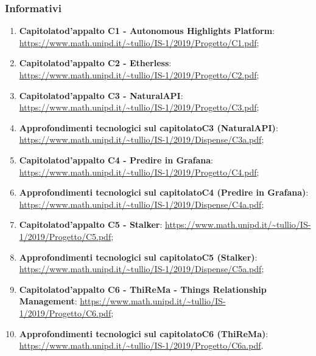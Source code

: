 \subsubsection{Informativi}
\begin{enumerate}
    \item \textbf{Capitolato}\glosp \textbf{d'appalto C1 - Autonomous Highlights Platform}: \url{https://www.math.unipd.it/~tullio/IS-1/2019/Progetto/C1.pdf};
    \item \textbf{Capitolato}\glosp \textbf{d'appalto C2 - Etherless}: \url{https://www.math.unipd.it/~tullio/IS-1/2019/Progetto/C2.pdf};
    \item \textbf{Capitolato}\glosp \textbf{d'appalto C3 - NaturalAPI}: \url{https://www.math.unipd.it/~tullio/IS-1/2019/Progetto/C3.pdf};
    \item \textbf{Approfondimenti tecnologici sul capitolato}\glosp \textbf{C3 (NaturalAPI)}: \url{https://www.math.unipd.it/~tullio/IS-1/2019/Dispense/C3a.pdf};
    \item \textbf{Capitolato}\glosp \textbf{d'appalto C4 - Predire in Grafana}\glo: \url{https://www.math.unipd.it/~tullio/IS-1/2019/Progetto/C4.pdf};
    \item \textbf{Approfondimenti tecnologici sul capitolato}\glosp \textbf{C4 (Predire in Grafana}\glo \textbf{)}: \url{https://www.math.unipd.it/~tullio/IS-1/2019/Dispense/C4a.pdf};
    \item \textbf{Capitolato}\glosp \textbf{d'appalto C5 - Stalker}: \url{https://www.math.unipd.it/~tullio/IS-1/2019/Progetto/C5.pdf};
    \item \textbf{Approfondimenti tecnologici sul capitolato}\glosp \textbf{C5 (Stalker)}: \url{https://www.math.unipd.it/~tullio/IS-1/2019/Dispense/C5a.pdf};
    \item \textbf{Capitolato}\glosp \textbf{d'appalto C6 - ThiReMa - Things Relationship Management}: \url{https://www.math.unipd.it/~tullio/IS-1/2019/Progetto/C6.pdf};
    \item \textbf{Approfondimenti tecnologici sul capitolato}\glosp \textbf{C6 (ThiReMa)}: \url{https://www.math.unipd.it/~tullio/IS-1/2019/Progetto/C6a.pdf}.
\end{enumerate}
